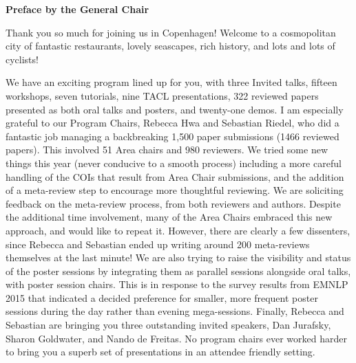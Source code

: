 \documentclass[11pt]{article}
\begin{document}
\begin{center}
  {\Large \bf Preface by the General Chair}
\end{center}

\vspace*{0.5cm}



Thank you so much for joining us in Copenhagen!  Welcome to a cosmopolitan city of fantastic restaurants, lovely seascapes, rich history, and lots and lots of cyclists! 

We have an exciting program lined up for you, with three Invited talks, fifteen workshops, seven tutorials, nine TACL presentations, 322 reviewed papers presented as both oral talks and posters, and twenty-one demos.  I am especially grateful to our Program Chairs, Rebecca Hwa and Sebastian Riedel, who did a fantastic job managing a backbreaking 1,500 paper submissions (1466 reviewed papers).  This involved 51 Area chairs and 980 reviewers.  We tried some new things this year (never conducive to a smooth process) including a more careful handling of the COIs that result from Area Chair submissions, and the addition of a meta-review step to encourage more thoughtful reviewing.  We are soliciting feedback on the meta-review process, from both reviewers and authors.  Despite the additional time involvement, many of the Area Chairs embraced this new approach, and would like to repeat it. However, there are clearly a few dissenters, since Rebecca and Sebastian ended up writing around 200 meta-reviews themselves at the last minute!  We are also trying to raise the visibility and status of the poster sessions by integrating them as parallel sessions alongside oral talks, with poster session chairs.  This is in response to the survey results from EMNLP 2015 that indicated a decided preference for smaller, more frequent poster sessions during the day rather than evening mega-sessions.  Finally, Rebecca and Sebastian are bringing you three outstanding invited speakers, Dan Jurafsky, Sharon Goldwater, and Nando de Freitas.   No program chairs ever worked harder to bring you a superb set of presentations in an attendee friendly setting.
\end{document}
